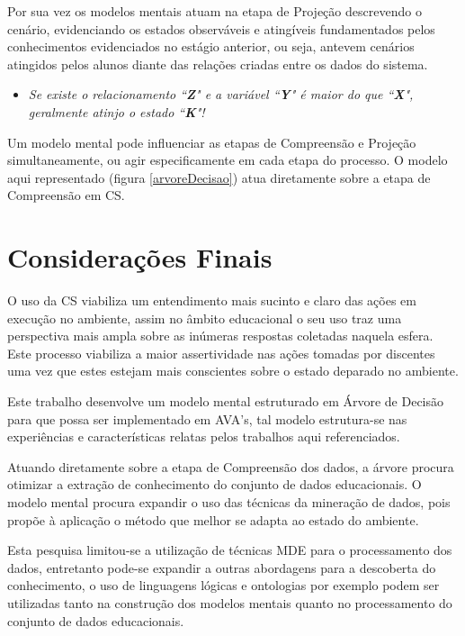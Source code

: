 \documentclass[12pt]{article}
\begin{document}
Por sua vez os modelos mentais atuam na etapa de Projeção descrevendo o cenário, evidenciando os estados observáveis e atingíveis fundamentados pelos conhecimentos evidenciados no estágio anterior, ou seja, antevem cenários atingidos pelos alunos diante das relações criadas entre os dados do sistema.

\begin{itemize}	
	\item \textit{Se existe o relacionamento ``\textbf{Z}" e a variável ``\textbf{Y}" é maior do que ``\textbf{X}", geralmente atinjo o estado ``\textbf{K}"!}
\end{itemize}

Um modelo mental pode influenciar as etapas de Compreensão e Projeção simultaneamente, ou agir especificamente em cada etapa do processo. O modelo aqui representado (figura \ref{arvoreDecisao}) atua diretamente sobre a etapa de Compreensão em CS.


\section{Considerações Finais}

O uso da CS viabiliza um entendimento mais sucinto e claro das ações em execução no ambiente, assim no âmbito educacional o seu uso traz uma perspectiva mais ampla sobre as inúmeras respostas coletadas naquela esfera. Este processo viabiliza a maior assertividade nas ações tomadas por discentes uma vez que estes estejam mais conscientes sobre o estado deparado no ambiente.

Este trabalho desenvolve um modelo mental estruturado em Árvore de Decisão para que possa ser implementado em AVA's, tal modelo estrutura-se nas experiências e características relatas pelos trabalhos aqui referenciados. 

Atuando diretamente sobre a etapa de Compreensão dos dados, a árvore procura otimizar a extração de conhecimento do conjunto de dados educacionais. O modelo mental procura expandir o uso das técnicas da mineração de dados, pois propõe à aplicação o método que melhor se adapta ao estado do ambiente.

Esta pesquisa limitou-se a utilização de técnicas MDE para o processamento dos dados, entretanto pode-se expandir a outras abordagens para a descoberta do conhecimento, o uso de linguagens lógicas e ontologias por exemplo podem ser utilizadas tanto na construção dos modelos mentais quanto no processamento do conjunto de dados educacionais.
\end{document}

